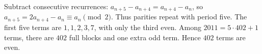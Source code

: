 Subtract consecutive recurrences: $a_{n+5}-a_{n+4}=a_{n+4}-a_n$, so $a_{n+5}=2a_{n+4}-a_n\equiv a_n\pmod2$. Thus parities repeat with period five. The first five terms are $1,1,2,3,7$, with only the third even. Among $2011=5\cdot402+1$ terms, there are $402$ full blocks and one extra odd term. Hence $\boxed{402}$ terms are even.
